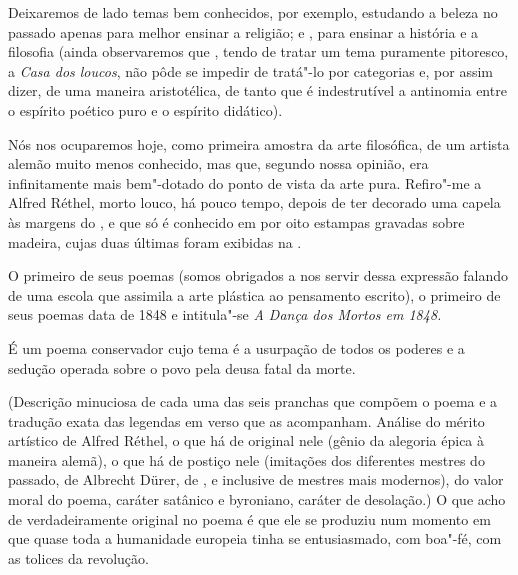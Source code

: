 Deixaremos de lado temas bem conhecidos, por exemplo,  estudando
a beleza no passado apenas para melhor ensinar a religião;  e
, para ensinar a história e a filosofia (ainda observaremos que
, tendo de tratar um tema puramente pitoresco, a \textit{Casa
dos loucos}, não pôde se impedir de tratá"-lo por categorias e, por
assim dizer, de uma maneira aristotélica, de tanto que é indestrutível
a antinomia entre o espírito poético puro e o espírito didático).

Nós nos ocuparemos hoje, como primeira amostra da arte filosófica, de um
artista alemão muito menos conhecido, mas que, segundo nossa opinião,
era infinitamente mais bem"-dotado do ponto de vista da arte pura.
Refiro"-me a Alfred Réthel, morto louco, há pouco tempo, depois de ter
decorado uma capela às margens do , e que só é conhecido em 
por oito estampas gravadas sobre madeira, cujas duas últimas foram
exibidas na .

O primeiro de seus poemas (somos obrigados a nos servir dessa expressão
falando de uma escola que assimila a arte plástica ao pensamento
escrito), o primeiro de seus poemas data de 1848 e intitula"-se
\textit{A Dança dos Mortos em 1848.}

É um poema conservador cujo tema é a usurpação de todos os poderes e a
sedução operada sobre o povo pela deusa fatal da morte.

(Descrição minuciosa de cada uma das seis pranchas que compõem o poema e
a tradução exata das legendas em verso que as acompanham. Análise do
mérito artístico de Alfred Réthel, o que há de original nele
(gênio da alegoria épica à maneira alemã), o que há de postiço nele (imitações
dos diferentes mestres do passado, de Albrecht Dürer, de , e
inclusive de mestres mais modernos), do valor moral do poema, caráter
satânico e byroniano, caráter de desolação.) O que acho de
verdadeiramente original no poema é que ele se produziu num momento em
que quase toda a humanidade europeia tinha se entusiasmado, com boa"-fé,
com as tolices da revolução.

